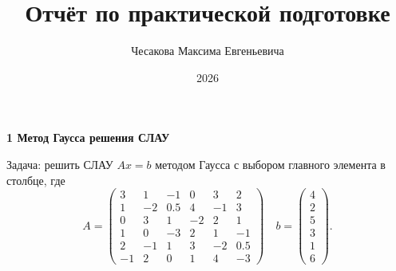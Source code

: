 \documentclass[calculation_methods, och]{SCWorks1}
\begin{document}


\title{Отчёт по практической подготовке}







\author{Чесакова Максима Евгеньевича}




\date{2026}

\maketitle











\textbf{1 Метод Гаусса решения СЛАУ}

Задача: решить СЛАУ $Ax = b$ методом Гаусса с выбором главного элемента в столбце, где
\[
A = \begin{pmatrix}
    3 & 1 & -1 & 0 & 3 & 2 \\
    1 & -2 & 0.5 & 4 & -1 & 3 \\
    0 & 3 & 1 & -2 & 2 & 1 \\
    1 & 0 & -3 & 2 & 1 & -1 \\
    2 & -1 & 1 & 3 & -2 & 0.5 \\
    -1 & 2 & 0 & 1 & 4 & -3
\end{pmatrix}
\quad
b = \begin{pmatrix}
    4 \\
    2 \\
    5 \\
    3 \\
    1 \\
    6
\end{pmatrix}.
\]
\end{document}
